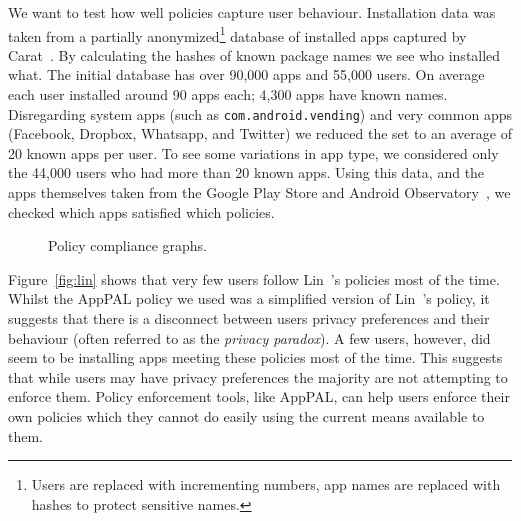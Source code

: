 \documentclass[]{llncs}
\begin{document}
We want to test how well policies capture user behaviour.
Installation data was taken from a partially anonymized\footnote{Users are replaced with incrementing numbers, app names are replaced with hashes to protect sensitive names.} database of installed apps captured by Carat~\cite{Oliner:2013ht}.
By calculating the hashes of known package names we see who installed what.
The initial database has over 90,000 apps and 55,000 users.
On average each user installed around 90 apps each; 4,300 apps have known names.
Disregarding system apps (such as \texttt{com.android.vending}) and very common apps (Facebook, Dropbox, Whatsapp, and Twitter) we reduced the set to an average of 20 known apps per user.
To see some variations in app type, we considered only the 44,000 users who had more than 20 known apps.
Using this data, and the apps themselves taken from the Google Play Store and Android Observatory~\cite{Barrera:2012iba}, we checked which apps satisfied which policies.

\begin{figure}\centering
  \caption{Policy compliance graphs.}
\end{figure}

Figure~\ref{fig:lin} shows that very few users follow Lin~\etal's policies most of the time.
Whilst the AppPAL policy we used was a simplified version of Lin~\etal's policy, it suggests that there is a disconnect between users privacy preferences and their behaviour (often referred to as the \emph{privacy paradox}).
A few users, however, did seem to be installing apps meeting these policies most of the time.
This suggests that while users may have privacy preferences the majority are not attempting to enforce them.
Policy enforcement tools, like AppPAL, can help users enforce their own policies which they cannot do easily using the current means available to them.
\end{document}
